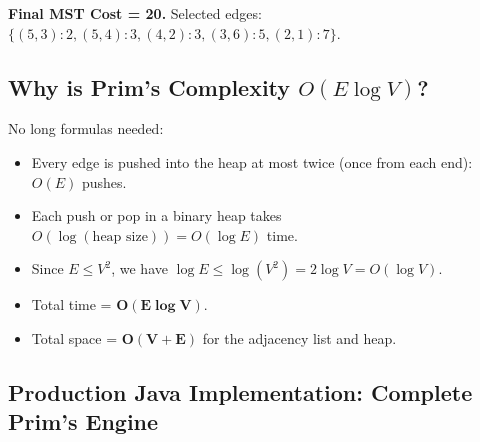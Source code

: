 \documentclass[10pt,journal,compsoc,onecolumn]{IEEEtran}
\begin{document}
\textbf{Final MST Cost = 20.} Selected edges: $\{ (5,3):2, (5,4):3, (4,2):3, (3,6):5, (2,1):7 \}$.

\subsection{Why is Prim's Complexity $O(E \log V)$?}

No long formulas needed:
\begin{itemize}
    \item Every edge is pushed into the heap at most twice (once from each end): $O(E)$ pushes.
    \item Each push or pop in a binary heap takes $O(\log(\text{heap size})) = O(\log E)$ time.
    \item Since $E \le V^2$, we have $\log E \le \log(V^2) = 2 \log V = O(\log V)$.
    \item Total time = $\mathbf{O(E \log V)}$.
    \item Total space = $\mathbf{O(V + E)}$ for the adjacency list and heap.
\end{itemize}

\subsection{Production Java Implementation: Complete Prim's Engine}
\end{document}
